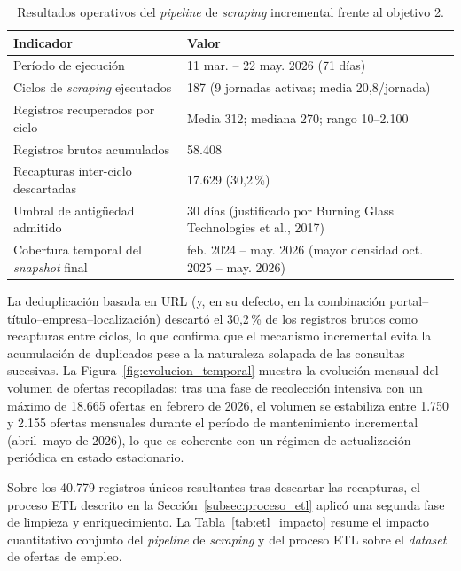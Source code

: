 \begin{table}[H]
  \caption{Resultados operativos del \textit{pipeline} de \textit{scraping} incremental frente al objetivo 2.}
  \label{tab:resumen_scraping}
  \centering
  \footnotesize
  \begin{tabular}{|p{7.5cm}|p{5.5cm}|}
    \hline
    \rowcolor{gray!15}
    \textbf{Indicador} & \textbf{Valor} \\
    \hline
    Período de ejecución & 11 mar. -- 22 may. 2026 (71 días) \\
    \hline
    Ciclos de \textit{scraping} ejecutados & 187 (9 jornadas activas; media 20,8/jornada) \\
    \hline
    Registros recuperados por ciclo & Media 312; mediana 270; rango 10--2.100 \\
    \hline
    Registros brutos acumulados & 58.408 \\
    \hline
    Recapturas inter-ciclo descartadas & 17.629 (30,2\,\%) \\
    \hline
    Umbral de antigüedad admitido & 30 días (justificado por Burning Glass Technologies et al., 2017) \\
    \hline
    Cobertura temporal del \textit{snapshot} final & feb. 2024 -- may. 2026 (mayor densidad oct. 2025 -- may. 2026) \\
    \hline
  \end{tabular}
\end{table}

La deduplicación basada en URL (y, en su defecto, en la combinación portal--título--empresa--localización) descartó el 30,2\,\% de los registros brutos como recapturas entre ciclos, lo que confirma que el mecanismo incremental evita la acumulación de duplicados pese a la naturaleza solapada de las consultas sucesivas. La Figura~\ref{fig:evolucion_temporal} muestra la evolución mensual del volumen de ofertas recopiladas: tras una fase de recolección intensiva con un máximo de 18.665 ofertas en febrero de 2026, el volumen se estabiliza entre 1.750 y 2.155 ofertas mensuales durante el período de mantenimiento incremental (abril--mayo de 2026), lo que es coherente con un régimen de actualización periódica en estado estacionario.

Sobre los 40.779 registros únicos resultantes tras descartar las recapturas, el proceso ETL descrito en la Sección~\ref{subsec:proceso_etl} aplicó una segunda fase de limpieza y enriquecimiento. La Tabla~\ref{tab:etl_impacto} resume el impacto cuantitativo conjunto del \textit{pipeline} de \textit{scraping} y del proceso ETL sobre el \textit{dataset} de ofertas de empleo.

